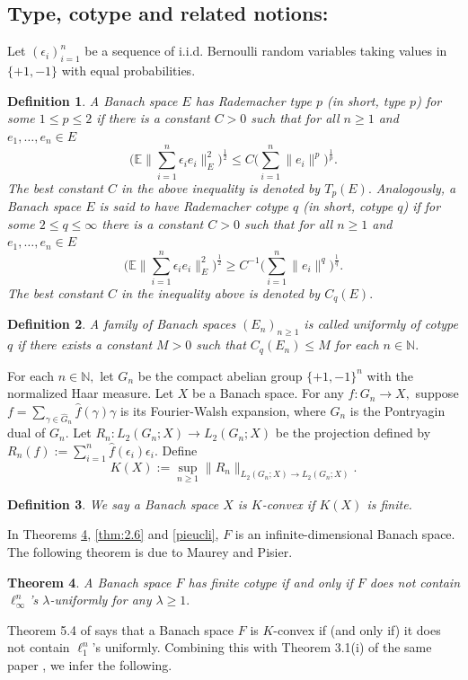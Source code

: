 \documentclass[a4paper,oneside,11pt, reqno]{amsart}
\numberwithin{equation}{section}
\newtheorem{theorem}{Theorem}[section]
\newtheorem{definition}[theorem]{Definition}
\theoremstyle{plain}
\begin{document}
\subsection{Type, cotype and related notions:}
Let $(\epsilon_i)_{i=1}^n$ be a sequence of i.i.d. Bernoulli random variables taking values in $\{+1,-1\}$ with equal probabilities.
\begin{definition}
    A Banach space $E$ has Rademacher type $p$ (in short, type $p$) for some $1\leqslant p\leqslant 2$ if there is a constant $C>0$ such that for all $n\geqslant 1$ and $e_1,\dots,e_n\in E$ \[\Big(\mathbb E \Big\|\sum_{i=1}^n\epsilon_ie_i\Big\|_E^2\Big)^{\frac{1}{2}}\leqslant C\Big(\sum_{i=1}^n\|e_i\|^p\Big)^{\frac{1}{p}}.\] 
    The best constant $C$ in the above inequality is denoted by $T_p(E).$ 
    Analogously, a Banach space $E$ is said to have Rademacher cotype $q$ (in short, cotype $q$) if for some $2\leqslant q\leqslant\infty$ there is a constant $C>0$ such that for all $n\geqslant 1$ and $e_1,\dots,e_n\in E$ \[\Big( \mathbb E\Big\|\sum_{i=1}^n\epsilon_ie_i\Big\|_E^2\Big)^{\frac{1}{2}}\geqslant C^{-1}\Big(\sum_{i=1}^n\|e_i\|^q\Big)^{\frac{1}{q}}.\]The best constant $C$ in the inequality above is denoted by $C_q(E).$ 
\end{definition}
\begin{definition}
  A family of Banach spaces $(E_n)_{n\geq 1}$ is called uniformly of cotype $q$ if there exists a constant $M>0$ such that $C_q(E_n)\leqslant M$ for each $n\in\mathbb N.$  
\end{definition}
For each $n\in\mathbb N,$ let $G_n$ be the compact abelian group $\{+1,-1\}^n$ with the normalized Haar measure. Let $X$ be a Banach space. For any $f:G_n\to X,$ suppose $f=\sum_{\gamma\in \widehat{G}_n}\widehat{f}(\gamma)\gamma $ is its Fourier-Walsh expansion, where $\widehat{G}_n$ is the Pontryagin dual of $G_n$. Let $R_n:L_2(G_n;X)\to L_2(G_n;X)$ be the projection defined by $R_n(f):=\sum_{i=1}^n\widehat{f}(\epsilon_i)\epsilon_i.$ Define 
\[K(X):=\sup_{n\geqslant 1}\|R_n\|_{L_2(G_n;X)\to L_2(G_n;X)}.\]  
\begin{definition}
 We say a Banach space $X$ is {\it $K$-convex} if $K(X)$ is finite.   
\end{definition}
In Theorems \ref{Maurey-Pisier}, \ref{thm:2.6} and \ref{pieucli}, $F$  is an infinite-dimensional Banach space. The following theorem is due to Maurey and Pisier. 
\begin{theorem} \cite[Theorem 3.3(ii)]{Pis85}\label{Maurey-Pisier}
A Banach space $F$ has finite cotype if and only if $F$ does not contain $\ell_\infty^n$'s $\lambda$-uniformly for any $\lambda \geqslant  1.$
\end{theorem}
Theorem 5.4 of \cite{Pis85} says that a Banach space $F$ is $K$-convex if (and only if) it does not contain $\ell_1^n$'s uniformly. Combining this with Theorem 3.1(i) of the same paper \cite{Pis85}, we infer the following. 
\end{document}
